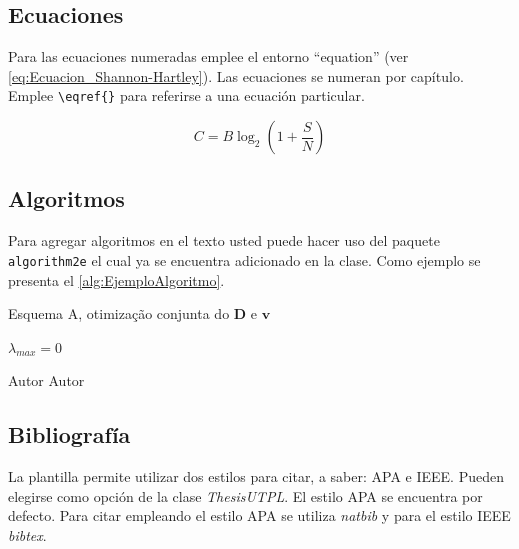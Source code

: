 \subsection{Ecuaciones}
Para las ecuaciones numeradas emplee el entorno ``equation'' (ver \eqref{eq:Ecuacion_Shannon-Hartley}). Las ecuaciones se numeran por capítulo. Emplee  \lstinline|\eqref{}| para referirse a una ecuación particular.  

\begin{equation}\label{eq:Ecuacion_Shannon-Hartley}
C = B \log_{2} \left( 1 + \frac{S}{N} \right) 
\end{equation}

\subsection{Algoritmos}

Para agregar algoritmos en el texto usted puede hacer uso del paquete \lstinline|algorithm2e| el cual ya se encuentra adicionado en la clase. Como ejemplo se presenta el \autoref{alg:EjemploAlgoritmo}. 


\begin{algorithm}[H]
	\caption{Esquema A, otimização conjunta do $\mathbf{D}$ e $ \mathbf{v} $}
	\label{alg:EjemploAlgoritmo}
	
	$ \lambda_{max} = 0 $\;
\end{algorithm} 
\AlgExtraCaptionUTPL %
	{Autor}					%
	{Autor} 				%



\subsection{Bibliografía}
\label{sec:Bibliografia}
La plantilla permite utilizar dos estilos para citar, a saber: APA e IEEE. Pueden elegirse como opción de la clase \textit{ThesisUTPL}. El estilo APA se encuentra por defecto. Para citar empleando el estilo APA se utiliza \textit{natbib} y para el estilo IEEE \textit{bibtex}. 

